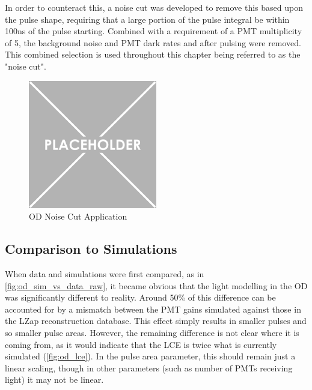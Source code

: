 \par
In order to counteract this, a noise cut was developed to remove this based upon the pulse shape, requiring that a large portion of the pulse integral be within 100ns of the pulse starting.
Combined with a requirement of a PMT multiplicity of 5, the background noise and PMT dark rates and after pulsing were removed.
This combined selection is used throughout this chapter being referred to as the "noise cut".

\begin{figure}
    \centering
    \includegraphics[width=0.5\textwidth]{Figures/Placeholder.png}
    \caption{OD Noise Cut Application}
    \label{fig:od_noise_cut}
\end{figure}

\subsection{Comparison to Simulations}
\par

When data and simulations were first compared, as in \autoref{fig:od_sim_vs_data_raw}, it became obvious that the light modelling in the OD was significantly different to reality.
Around 50\% of this difference can be accounted for by a mismatch between the PMT gains simulated against those in the LZap reconstruction database.
This effect simply results in smaller pulses and so smaller pulse areas.
However, the remaining difference is not clear where it is coming from, as it would indicate that the LCE is twice what is currently simulated (\autoref{fig:od_lce}).
In the pulse area parameter, this should remain just a linear scaling, though in other parameters (such as number of PMTs receiving light) it may not be linear.




